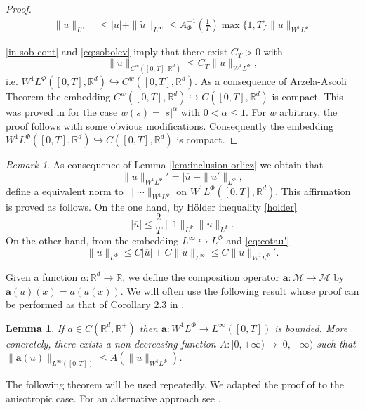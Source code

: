 \documentclass[twoside]{article}
\newtheorem{lem}[thm]{Lemma}
\theoremstyle{remark}
\newtheorem{comentario}{Remark}
\newcommand{\orlnor}{\|_{L^{\Phi}}}
\newcommand{\linf}{\|_{L^{\infty}}}
\newcommand{\lphi}{L^{\Phi}}
\newcommand{\wphi}{W^{1}\lphi}
\newcommand{\sobnor}{\|_{W^{1}\lphi}}
\renewcommand{\b}[1]{\boldsymbol{#1}}
\newcommand{\rr}{\mathbb{R}}
\renewcommand{\leq}{\leqslant}
\begin{document}
\begin{proof}
\[\begin{split}
 \|u\linf &\leq |\overline{u}|+\|\tilde{u}\linf\leq A_{\Phi}^{-1}\left(\frac{1}{T}\right)\max\{1,T\}\|u\sobnor
 \end{split}
 \]
 
\ref{in-sob-cont} and  \ref{eq:sobolev} imply that there exist $C_T>0$ with
\[\|u\|_{  C^w([0,T],\rr^d) }\leq   C_T\|u\sobnor,\]
i.e. $\wphi\left([0,T],\rr^d\right)\hookrightarrow C^w([0,T],\rr^d)$.
As a consequence of Arzela-Ascoli Theorem
 the embedding $C^w\left([0,T],\rr^d\right)\hookrightarrow C([0,T],\rr^d)$ is  compact. This was proved in  \cite[Prop. 5.13]{driver}   for the case $w(s)=|s|^{\alpha}$ with $0< \alpha\leq 1$. For  $w$  arbitrary, the proof follows with some obvious modifications. Consequently the embedding  $\wphi\left([0,T],\rr^d\right)\hookrightarrow C([0,T],\rr^d)$ is compact.
\end{proof}


\begin{comentario}\label{com:equiv-norm} As consequence of Lemma \ref{lem:inclusion orlicz} we obtain that 
  \[\|u\sobnor'=|\overline{u}|+\|u'\orlnor,\]
  define a equivalent norm to $\|\cdots\sobnor$ on $\wphi([0,T],\rr^d)$. This affirmation is proved as follows.  On the one hand, by H\"older inequality \eqref{holder}
  \[|\overline{u}|\leq \frac{2}{T}\|1\|_{L^{\Psi}}\|u\orlnor .\]
  On the other hand, from the embedding $L^{\infty}\hookrightarrow \lphi$ and \eqref{eq:cotau'}
  \[\|u\orlnor\leq C|\overline{u}|+C\|\tilde{u}\|_{L^{\infty}}\leq C\|u\sobnor'.\]
  
  
\end{comentario}


Given a function $a:\mathbb{R}^d\to \mathbb{R}$, we define the composition operator $\b{a}:\mathcal{M}\to \mathcal{M}$ by $\b{a}(u)(x)= a(u(x))$.
We will often use the following result whose proof can be performed as that of  Corollary 2.3 in \cite{ABGMS2015}.
\begin{lem}\label{lem:cota-a}
\label{a_bound} If $a\in C(\mathbb{R}^d,\mathbb{R}^+)$ then $\b{a}:\wphi\to L^{\infty}([0,T])$ is bounded.
More concretely,  there exists a non decreasing function $A:[0,+\infty)\to[0,+\infty)$ such that
 $\|\b{a}(u)\|_{L^{\infty}([0,T])}\leq A(\|u\|_{\wphi})$.
\end{lem}

The following theorem will be used repeatedly. We adapted the proof of \cite[Lemma 2.5]{ABGMS2015} to the anisotropic case.    For an alternative approach see \cite{chamra2017anisotropic}.  
\end{document}
